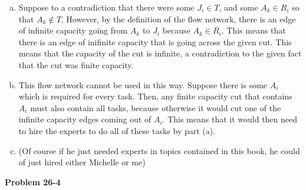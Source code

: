 \documentclass{article}
\begin{document}
\begin{enumerate}[a.]
\item
Suppose to a contradiction that there were some $J_i\in T$, and some $A_k\in R_i$ so that $A_k \not \in T$. However, by the definition of the flow network, there is an edge of infinite capacity going from $A_k$ to $J_i$ because $A_k \in R_i$. This means that there is an edge of inifinite capacity that is going across the given cut. This means that the capacity of the cut is infinite, a contradiction to the given fact that the cut was finite capacity.
\item

This flow network cannot be used in this way. Suppose there is some $A_i$ which is required for every task. Then, any finite capacity cut that contains $A_i$ must also contain all tasks, because otherwise it would cut one of the infinite capacity edges coming out of $A_i$. This means that it would then need to hire the experts to do all of these tasks by part (a).

\item%

(Of course if he just needed experts in topics contained in this book, he could of just hired either Michelle or me)
\end{enumerate}

\noindent\textbf{Problem 26-4}\\
\end{document}
